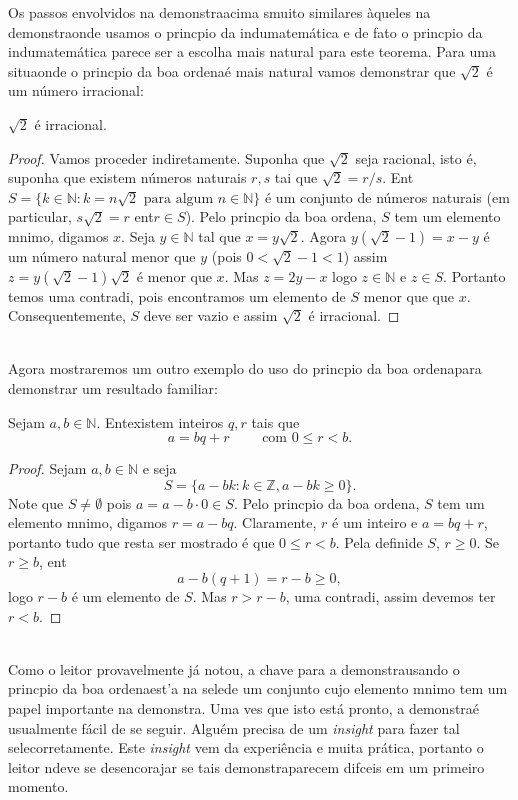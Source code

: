 Os passos envolvidos na demonstra\cao acima s\ao muito similares \`aqueles na demonstra\cao onde usamos o princ\ih pio da indu\cao matem\'atica e de fato o princ\ih pio da indu\cao matem\'atica parece ser a escolha mais natural para este teorema. Para uma situa\cao onde o princ\ih pio da boa ordena\cao \'e mais natural vamos demonstrar que $\sqrt{2}$ \'e um n\'umero irracional:
\begin{teob}\label{indteo4}
$\sqrt{2}$ \'e irracional.
\end{teob}
\begin{proof}
Vamos proceder indiretamente. Suponha que $\sqrt{2}$ seja racional, isto \'e, suponha que existem n\'umeros naturais $r,s$ tai que $\sqrt{2}=r/s$. Ent\ao $S=\{k\in\mathbb{N}: k=n\sqrt{2} \textrm{ para algum } n\in\mathbb{N}\}$ \'e um conjunto de n\'umeros naturais (em particular, $s\sqrt{2}=r$ ent\ao $r\in S$). Pelo princ\ih pio da boa ordena\caoi, $S$ tem um elemento m\ih nimo, digamos $x$. Seja $y\in\mathbb{N}$ tal que $x=y\sqrt{2}$. Agora $y(\sqrt{2}-1)=x-y$ \'e um n\'umero natural menor que $y$ (pois $0<\sqrt{2}-1<1$) assim $z=y(\sqrt{2}-1)\sqrt{2}$ \'e menor que $x$. Mas $z=2y-x$ logo $z\in\mathbb{N}$ e $z\in S$. Portanto temos uma contradi\caoi, pois encontramos um elemento de $S$ menor que que $x$. Consequentemente, $S$ deve ser vazio e assim $\sqrt{2}$ \'e irracional.
\end{proof}
\\

Agora mostraremos um outro exemplo do uso do princ\ih pio da boa ordena\cao para demonstrar um resultado familiar:
\begin{teob}\label{indteo5}
Sejam $a,b\in\mathbb{N}$. Ent\ao existem inteiros $q,r$ tais que
\[
a=bq+r \quad\quad\textrm{ com } 0\leq r<b.
\]
\end{teob}
\begin{proof}
Sejam $a,b\in\mathbb{N}$ e seja
\[
S=\{a-bk: k\in\mathbb{Z}, a-bk\geq 0\}.
\]
Note que $S\neq\emptyset$ pois $a=a-b\cdot 0\in S$. Pelo princ\ih pio da boa ordena\cao, $S$ tem um elemento m\ih nimo, digamos $r=a-bq$. Claramente, $r$ \'e um inteiro e $a=bq+r$, portanto tudo que resta ser mostrado \'e que $0\leq r<b$. Pela defini\cao de $S$, $r\geq 0$. Se $r\geq b$, ent\ao
\[
a-b(q+1)=r-b\geq 0,
\]
logo $r-b$ \'e um elemento de $S$. Mas $r>r-b$, uma contradi\caoi, assim devemos ter $r<b$.
\end{proof}
\\

Como o leitor provavelmente j\'a notou, a chave para a demonstra\cao usando o princ\ih pio da boa ordena\cao est'a na sele\cao de um conjunto cujo elemento m\ih nimo tem um papel importante na demonstra\caoi. Uma ves que isto est\'a pronto, a demonstra\cao \'e usualmente f\'acil de se seguir. Algu\'em precisa de um {\it insight} para fazer tal sele\cao corretamente. Este {\it insight} vem da experi\^encia e muita pr\'atica, portanto o leitor n\ao deve se desencorajar se tais demonstra\coes parecem dif\ih ceis em um primeiro momento.

